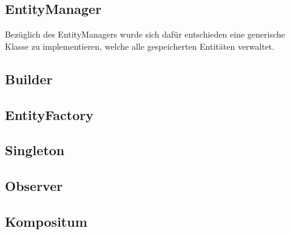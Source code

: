 \subsection{EntityManager}
Bezüglich des EntityManagers wurde sich dafür entschieden eine generische Klasse zu implementieren, welche alle gespeicherten Entitäten verwaltet. 

\subsection{Builder}

\subsection{EntityFactory}

\subsection{Singleton}

\subsection{Observer}

\subsection{Kompositum}